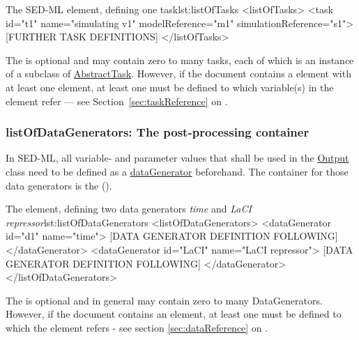 
\begin{myXmlLst}{The SED-ML  element, defining one task}{lst:listOfTasks}
<listOfTasks>
 <task id="t1" name="simulating v1" modelReference="m1" simulationReference="s1">
 [FURTHER TASK DEFINITIONS]
</listOfTasks>
\end{myXmlLst}

The  is optional and may contain zero to many tasks, each of which is an instance of a subclass of \hyperref[class:abstractTask]{AbstractTask}.
However, if the \currentLV document contains a  element with at least one  element, at least one  must be defined to which variable(s) in the  element refer --- see Section~\ref{sec:taskReference} on .


\subsubsection{listOfDataGenerators: The post-processing container}
\label{sec:listOfDataGenerators}

In SED-ML, all variable- and parameter values that shall be used in the \hyperref[class:output]{Output} class need to be defined as a \hyperref[class:dataGenerator]{dataGenerator} beforehand. The container for those data generators is the  (). 


%
\begin{myXmlLst}{The  element, defining two data generators \emph{time} and \emph{LaCI repressor}}{lst:listOfDataGenerators}
<listOfDataGenerators>
 <dataGenerator id="d1" name="time">
  [DATA GENERATOR DEFINITION FOLLOWING]
 </dataGenerator>
 <dataGenerator id="LaCI" name="LaCI repressor">
  [DATA GENERATOR DEFINITION FOLLOWING]
 </dataGenerator>
</listOfDataGenerators>
\end{myXmlLst}

The  is optional and in general may contain zero to many DataGenerators. However, if the \currentLV document contains  an    element, at least one   must be defined to which the  element refers -  see section \ref{sec:dataReference} on .



